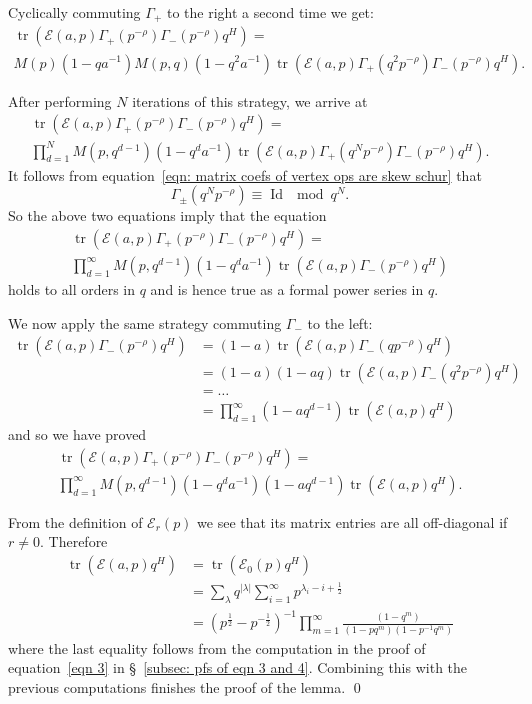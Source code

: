 \documentclass[12pt]{amsart}
\newcommand{\half}{\frac{1}{2}}
\theoremstyle{definition}
\newcommand{\tr}{\operatorname{tr}}
\newcommand{\E}{\mathcal{E}}
\newcommand{\ptotheminusrho}{p^{-\rho}}
\begin{document}
Cyclically commuting $\Gamma_{+}$ to the right a second time we get:
\begin{multline*}
 \tr (\E (a,p)\Gamma_{+}(\ptotheminusrho)\Gamma_{-}(\ptotheminusrho
)q^{H}) = \\
M(p)(1-qa^{-1})M(p,q)(1-q^{2}a^{-1}) \tr (\E (a,p)\Gamma_{+}(q^{2}\ptotheminusrho)\Gamma_{-}(\ptotheminusrho
)q^{H}).
\end{multline*}

After performing $N$ iterations of this strategy, we arrive at
\begin{multline*}
 \tr (\E (a,p)\Gamma_{+}(\ptotheminusrho)\Gamma_{-}(\ptotheminusrho
)q^{H}) = \\
\prod_{d=1}^{N}M(p,q^{d-1})(1-q^{d}a^{-1}) \tr (\E (a,p)\Gamma_{+}(q^{N}\ptotheminusrho)\Gamma_{-}(\ptotheminusrho
)q^{H}).
\end{multline*}
It follows from equation~\eqref{eqn: matrix coefs of vertex ops are
skew schur} that 
\[
\Gamma_{\pm}(q^{N}\ptotheminusrho )\equiv \operatorname{Id} \mod q^{N}.
\]
So the above two equations imply that the equation
\begin{multline*}
 \tr (\E (a,p)\Gamma_{+}(\ptotheminusrho)\Gamma_{-}(\ptotheminusrho
)q^{H}) = \\
\prod_{d=1}^{\infty }M(p,q^{d-1})(1-q^{d}a^{-1}) \tr (\E (a,p)\Gamma_{-}(\ptotheminusrho
)q^{H})
\end{multline*}
holds to all orders in $q$ and is hence true as a formal power series
in $q$.

We now apply the same strategy commuting $\Gamma_{-}$ to the left:
\begin{align*}
\tr (\E (a,p)\Gamma_{-}(\ptotheminusrho )q^{H}) &=(1-a)\tr (\E (a,p)\Gamma_{-}(q\ptotheminusrho )q^{H}) \\
&=(1-a)(1-aq)\tr (\E (a,p)\Gamma_{-}(q^{2}\ptotheminusrho )q^{H}) \\
&=\dots \\
&=\prod_{d=1}^{\infty}(1-aq^{d-1})\tr (\E (a,p)q^{H})
\end{align*}
and so we have proved
\begin{multline*}
 \tr (\E (a,p)\Gamma_{+}(\ptotheminusrho)\Gamma_{-}(\ptotheminusrho
)q^{H}) = \\
\prod_{d=1}^{\infty }M(p,q^{d-1})(1-q^{d}a^{-1})(1-aq^{d-1})\tr (\E (a,p)q^{H}).
\end{multline*}


From the definition of $\E_{r}(p)$ we see that its matrix entries are
all off-diagonal if $r\neq 0$. Therefore
\begin{align*}
\tr (\E (a,p) q^{H})&=\tr (\E_{0}(p)q^{H})\\
&= \sum_{\lambda} q^{|\lambda |}\sum_{i=1}^{\infty}p^{\lambda_i -i+\half}\\
&=(p^{\half}-p^{-\half})^{-1}\prod_{m=1}^{\infty} \frac{(1-q^{m})}{(1-pq^{m})(1-p^{-1}q^{m})}
\end{align*}
where the last equality follows from the computation in the proof of
equation~\eqref{eqn 3} in \S~\ref{subsec: pfs of eqn 3 and
4}. Combining this with the previous computations finishes the proof
of the lemma. \qed
\end{document}
